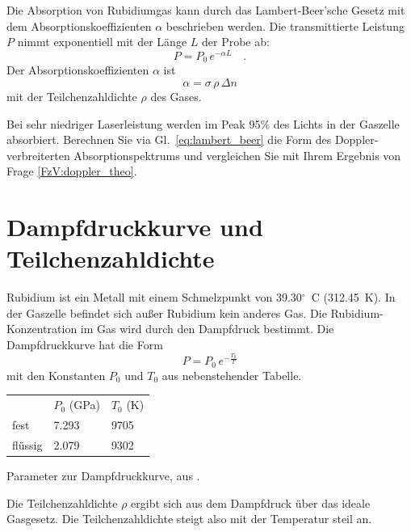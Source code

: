 Die Absorption von Rubidiumgas kann durch das Lambert-Beer'sche Gesetz mit dem Absorptionskoeffizienten $\alpha$ beschrieben werden. Die transmittierte Leistung $P$ nimmt exponentiell mit der Länge $L$ der Probe ab:
\begin{equation}
	P = P_0  \, e^{- \alpha L} \quad . \label{eq:lambert_beer}
\end{equation}
Der Absorptionskoeffizienten $\alpha$ ist
\begin{equation}
	\alpha = \sigma  \, \rho  \, \Delta n
\end{equation}
mit der Teilchenzahldichte $\rho$ des Gases.


\begin{questions}
	\item Bei sehr niedriger Laserleistung werden im Peak 95\% des Lichts in der Gaszelle absorbiert. Berechnen Sie via Gl.~\ref{eq:lambert_beer} die Form des Doppler-verbreiterten Absorptionspektrums und vergleichen Sie mit Ihrem Ergebnis von Frage \ref{FzV:doppler_theo}.
\end{questions}


\section{Dampfdruckkurve und Teilchenzahldichte}

Rubidium ist ein Metall mit einem Schmelzpunkt von 39.30$^\circ$~C (312.45~K). In der Gaszelle befindet sich außer Rubidium kein anderes Gas. Die Rubidium-Konzentration im Gas wird durch den Dampfdruck bestimmt. Die Dampfdruckkurve hat die Form
\begin{equation}
    P = P_0 \, e^{- \frac{T_0}{T}}
\end{equation}
mit den Konstanten $P_0$ und $T_0$ aus nebenstehender Tabelle. 

\begin{margintable}
    \begin{tabular}{lll}
           & $P_0$ (GPa) & $T_0$ (K) \\
           fest  &  7.293   & 9705 \\
           flüssig  &  2.079  & 9302 \\
    \end{tabular}
	\caption{Parameter zur Dampfdruckkurve, aus \cite{Data85}.}
\end{margintable}



Die Teilchenzahldichte $\rho$ ergibt sich aus dem Dampfdruck über das ideale Gasgesetz. Die Teilchenzahldichte steigt also mit der Temperatur steil an.


